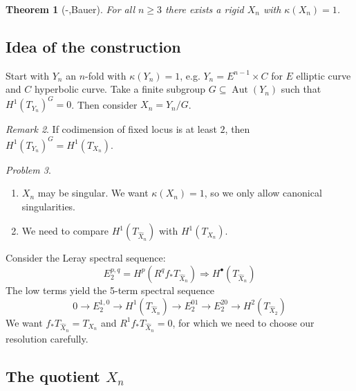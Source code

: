 \documentclass[A4paper, british, reqno]{amsart}
\theoremstyle{darkgreentheorem}
\newtheorem{thm}{Theorem}[section]
\theoremstyle{darkbluedefinition}
\theoremstyle{darkredexample}
\theoremstyle{remark}
\newtheorem{rem}[thm]{Remark}
\newtheorem{pbl}[thm]{Problem}
\DeclareMathOperator{\Aut}{Aut}
\newcommand{\1}{\mathbbm{1}}
\newcommand{\grd}{^{\bullet}}
\newcommand{\tms}{\times}
\newcommand{\sub}{\subseteq}
\begin{document}
\begin{thm}[-,Bauer]
    For all $n\geqslant 3$ there exists a rigid $X_{n}$ with $\kappa(X_{n})=1$.
\end{thm}

\subsection{Idea of the construction}

Start with $Y_{n}$ an $n$-fold with $\kappa(Y_{n})=1$, e.g. $Y_{n}=E^{n-1}\tms C$ for $E$ elliptic curve and $C$ hyperbolic curve.
Take a finite subgroup $G\sub \Aut(Y_{n})$ such that $H^{1}(T_{Y_{n}})^{G}=0$.
Then consider $X_{n}=Y_{n}/G$.

\begin{rem}
    If codimension of fixed locus is at least $2$, then $H^{1}(T_{Y_{n}})^{G}=H^{1}(T_{X_{n}})$.
\end{rem}

\begin{pbl}
    \begin{enumerate}[label=\alph*)]
	\item $X_{n}$ may be singular.
	    We want $\kappa(X_{n})=1$, so we only allow canonical singularities.
	\item We need to compare $H^{1}(T_{\hat{X}_{n}})$ with $H^{1}(T_{X_{n}})$.
    \end{enumerate}
\end{pbl}

Consider the Leray spectral sequence:
\[ E_{2}^{p,q}=H^{p}(R^{q}f_{*}T_{\hat{X}_{n}})\Rightarrow H\grd(T_{\hat{X}_{n}}) \]
The low terms yield the 5-term spectral sequence
\[ 0\to E_{2}^{1,0}\to H^{1}(T_{\hat{X}_{n}})\to E_{2}^{01}\to E_{2}^{20}\to H^{2}(T_{\hat{X}_{2}}) \]
We want $f_{*}T_{\hat{X}_{n}}=T_{X_{n}}$ and $R^{1}f_{*}T_{\hat{X}_{n}}=0$, for which we need to choose our resolution carefully.

\subsection{The quotient $X_{n}$}
\end{document}
